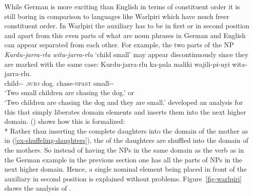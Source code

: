 \documentclass[output=paper]{langsci/langscibook}
\begin{document}
While German is more exciting than English in terms of constituent order it is still boring in
comparison to languages like Warlpiri which have much freer constituent order. In
Warlpiri the auxiliary has to be in first or in second position \citep[]{DS99a} and apart from this even parts of what are noun
phrases in German and English can appear separated from each other. For example, the two parts of
the NP \emph{Kurdu-jarra-rlu wita-jarra-rlu} `child small' may appear discontinuously since they are marked with
the same case:
\ea
\label{ex-warlpiri}
\gll Kurdu-jarra-rlu  ka-pala                 maliki     wajili-pi-nyi        wita-jarra-rlu.\\
     child-\DU-\ERG{} \DU.\textsc{subj} dog.\ABS{} chase-\textsc{npast} small-\DU-\ERG\\
\glt `Two small children are chasing the dog.' or\\
     `Two children are chasing the dog and they are small.'
\z  
\citet{DS99a} developed an analysis for this that simply liberates domain elements and inserts them
into the next higher domain. () shows how this is formalized:
\ea
{} \impl\\*
\z
Rather than inserting the complete daughters into the domain of the mother as in
(\ref{ex-shuffeling-daughters}), the \domvs of the daughters are shuffled into the domain of the
mothers. So instead of having the NPs in the same domain as the verb as in the German example in the
previous section one has all the parts of NPs in the next higher domain. Hence, a single nominal element
being placed in front of the auxiliary in second position is explained without
problems. Figure~\ref{fig-warlpiri} shows the analysis of .
\end{document}
